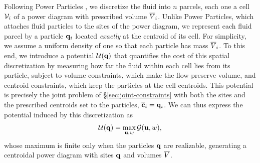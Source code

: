 \documentclass[main.tex]{subfiles}
\begin{document}
Following Power Particles \cite{deGoes2015PowerParticles}, we discretize the fluid into $n$ parcels, each one a cell $\mathcal{V}_i$ of a power diagram with prescribed volume $\overline{V}_i$.
Unlike Power Particles, which attaches fluid particles to the sites of the power diagram, we represent each fluid parcel by a particle $\mathbf{q}_i$ located \emph{exactly} at the centroid of its cell.
For simplicity, we assume a uniform density of one so that each particle has mass $\overline{V}_i$.
To this end, we introduce a potential $\mathcal{U}(\mathbf{q})$ that quantifies the cost of this spatial discretization by measuring how far the fluid within each cell lies from its particle, subject to volume constraints, which make the flow preserve volume, and centroid constraints, which keep the particles at the cell centroids.
This potential is precisely the joint problem of \S\ref{sec:joint-constraints} with both the sites and the prescribed centroids set to the particles, \ie $\overline{\mathbf{c}}_i = \mathbf{q}_i$.
We can thus express the potential induced by this discretization as
\begin{equation}
  \mathcal{U}(\mathbf{q}) = \max_{\mathbf{u}, w} \mathcal{G}(\mathbf{u}, w) ,
  \label{eq:flow-centroid-potential}
\end{equation}
whose maximum is finite only when the particles $\mathbf{q}$ are realizable, generating a centroidal power diagram with sites $\mathbf{q}$ and volumes $\overline{V}$.
\end{document}
